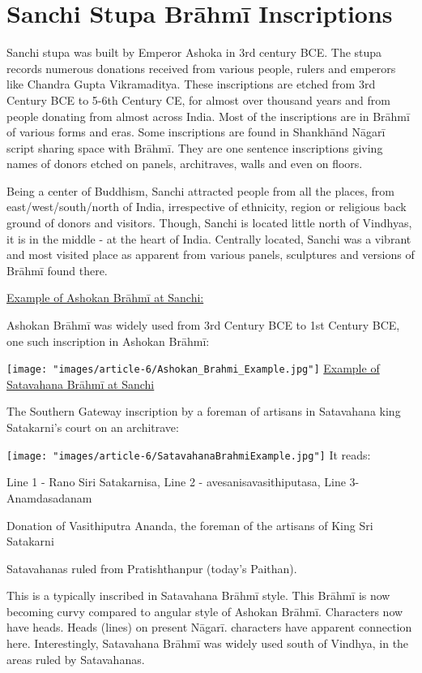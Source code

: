 \section*{Sanchi Stupa Brāhmī Inscriptions}

Sanchi stupa was built by Emperor Ashoka in 3rd century BCE. The stupa records numerous donations received from various people, rulers and emperors like Chandra Gupta Vikramaditya. These inscriptions are etched from 3rd Century BCE to 5-6th Century CE, for almost over thousand years and from people donating from almost across India. Most of the inscriptions are in Brāhmī of various forms and eras. Some inscriptions are found in Shankhānd Nāgarī script sharing space with Brāhmī. They are one sentence inscriptions giving names of donors etched on panels, architraves, walls and even on floors. 

Being a center of Buddhism, Sanchi attracted people from all the places, from east/west/south/north of India, irrespective of ethnicity, region or religious back ground of donors and visitors. Though, Sanchi is located little north of Vindhyas, it is in the middle - at the heart of India. Centrally located, Sanchi was a vibrant and most visited place as apparent from various panels, sculptures and versions of Brāhmī found there.

\underline{Example of Ashokan Brāhmī at Sanchi:}

Ashokan Brāhmī was widely used from 3rd Century BCE to 1st Century BCE, one such inscription in Ashokan Brāhmī:

\texttt{[image: "images/article-6/Ashokan\_Brahmi\_Example.jpg"]}
\underline{Example of Satavahana Brāhmī at Sanchi}

The Southern Gateway inscription by a foreman of artisans in Satavahana king Satakarni’s court on an architrave:

\texttt{[image: "images/article-6/SatavahanaBrahmiExample.jpg"]}
It reads:

Line 1 - Rano Siri Satakarnisa, Line 2 - avesanisavasithiputasa, Line 3- Anamdasadanam

Donation of Vasithiputra Ananda, the foreman of the artisans of King Sri Satakarni

Satavahanas ruled from Pratishthanpur (today’s Paithan).

This is a typically inscribed in Satavahana Brāhmī style. This Brāhmī is now becoming curvy compared to angular style of Ashokan Brāhmī. Characters now have heads. Heads (lines) on present Nāgarī. characters have apparent connection here. Interestingly, Satavahana Brāhmī was widely used south of Vindhya, in the areas ruled by Satavahanas. 

